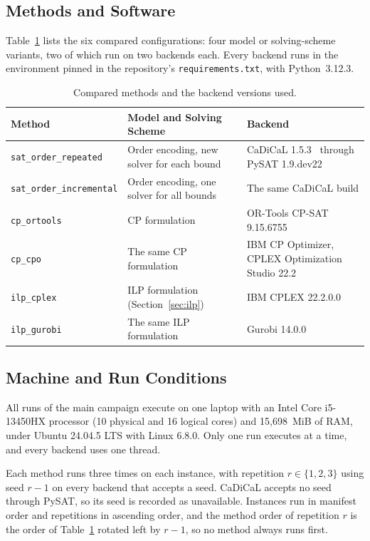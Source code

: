 \subsection{Methods and Software}\label{sec:setup-methods}

Table~\ref{tab:setup-methods} lists the six compared configurations: four model or solving-scheme variants, two of which run on two backends each. Every backend runs in the environment pinned in the repository's \texttt{requirements.txt}, with Python~3.12.3.

\begin{table}[h]
\caption{Compared methods and the backend versions used.}
\label{tab:setup-methods}
\centering
\begin{tabular}{l>{\raggedright\arraybackslash}p{.29\linewidth}>{\raggedright\arraybackslash}p{.33\linewidth}}
\toprule
\textbf{Method} & \textbf{Model and Solving Scheme} & \textbf{Backend} \\
\midrule
\texttt{sat\_order\_repeated} & Order encoding, new solver for each bound & CaDiCaL 1.5.3~\cite{cadical} through PySAT 1.9.dev22~\cite{pysat} \\
\texttt{sat\_order\_incremental} & Order encoding, one solver for all bounds & The same CaDiCaL build \\
\texttt{cp\_ortools} & CP formulation & OR-Tools CP-SAT 9.15.6755~\cite{ortools} \\
\texttt{cp\_cpo} & The same CP formulation & IBM CP Optimizer, CPLEX Optimization Studio 22.2~\cite{cplex} \\
\texttt{ilp\_cplex} & ILP formulation (Section~\ref{sec:ilp}) & IBM CPLEX 22.2.0.0~\cite{cplex} \\
\texttt{ilp\_gurobi} & The same ILP formulation & Gurobi 14.0.0~\cite{gurobi} \\
\bottomrule
\end{tabular}
\end{table}

\subsection{Machine and Run Conditions}\label{sec:setup-conditions}

All runs of the main campaign execute on one laptop with an Intel Core i5-13450HX processor (10 physical and 16 logical cores) and 15{,}698~MiB of RAM, under Ubuntu 24.04.5 LTS with Linux 6.8.0. Only one run executes at a time, and every backend uses one thread.

Each method runs three times on each instance, with repetition $r \in \{1, 2, 3\}$ using seed $r - 1$ on every backend that accepts a seed. CaDiCaL accepts no seed through PySAT, so its seed is recorded as unavailable. Instances run in manifest order and repetitions in ascending order, and the method order of repetition $r$ is the order of Table~\ref{tab:setup-methods} rotated left by $r - 1$, so no method always runs first.

